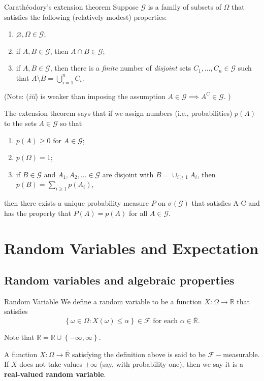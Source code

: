 \begin{thrm}{Carathéodory's extension theorem}{}
Suppose \( \mathcal{G}  \) is a family of subsets of \( \Omega  \) that satisfies the following (relatively modest) properties:
\begin{enumerate}[label = \emph{\roman*.)}]
    \item \( \varnothing , \Omega \in \mathcal{G}  \);
    \item if \( A, B \in \mathcal{G}  \), then \( A \cap B \in \mathcal{G}  \);
    \item if \( A,B \in \mathcal{G}  \), then there is a \emph{finite} number of \emph{disjoint} sets \( C_1 ,\dots , C_{n} \in  \mathcal{G}   \) such that \( A \setminus B = \bigcup_{i=1}^{n} C_{i}  \).
\end{enumerate}
(Note: (\emph{iii}) is weaker than imposing the assumption \( A \in \mathcal{G} \implies A^{C} \in  \mathcal{G}  \). )

The extension theorem says that if we assign numbers (i.e., probabilities) \( p(A) \) to the sets \( A \in \mathcal{G}  \) so that 

\begin{enumerate}[label = \Alph*.]
    \item \( p(A) \geq 0 \text{ for } A \in \mathcal{G}   \); 
    \item \( p(\Omega ) = 1\);
    \item if \( B \in \mathcal{G}  \)  and \( A_1, A_2, \dots  \in \mathcal{G} \) are disjoint with \( B = \cup_{i\geq 1}A_{i}   \), then \( p(B) = \sum_{i\geq 1}p(A_{i} )  \), 
\end{enumerate}
then there exists a unique probability measure \( P \) on \( \sigma (\mathcal{G} ) \) that satisfies A-C and has the property that \( P(A) = p(A)  \) for all \( A \in \mathcal{G}  \).
\end{thrm}

\section{Random Variables and Expectation}

\subsection{Random variables and algebraic properties}


\begin{defn}{Random Variable}{}
We define a random variable to be a function \( X: \Omega \to \overline{\mathbb{R}}  \) that satisfies
\[
    \left\{ \omega \in \Omega : X(\omega )\leq \alpha  \right\} \in \mathcal{F} \text{ for each } \alpha \in \overline{\mathbb{R} }.   
\]

Note that \( \overline{\mathbb{R} } = \mathbb{R} \cup \left\{ - \infty , \infty  \right\}   \). 
\end{defn}
A function \( X : \Omega \to \overline{\mathbb{R} } \) satisfying the definition above is said to be \( \mathcal{F}-\)measurable. If \( X \) does not take values \( \pm \infty  \) (say, with probability one), then we say it is a \textbf{real-valued random variable}. 

